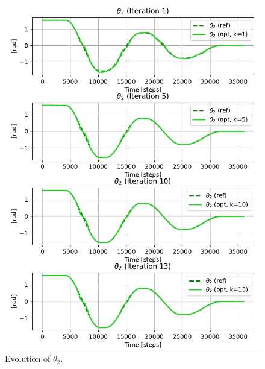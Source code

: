 \begin{figure}[htb]
    \includegraphics[width=1\linewidth]{img/2-task2/th2_evolution.pdf}
    \caption{Evolution of $\theta_2$.}
    \label{fig:theta2-evolution}
\end{figure}

